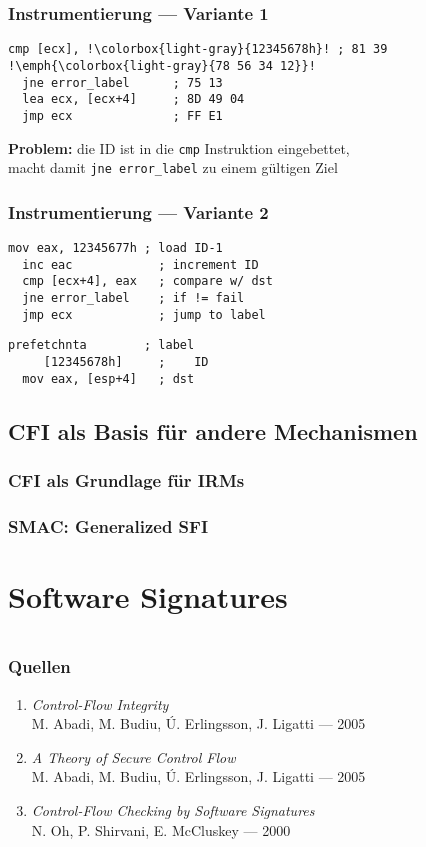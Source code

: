 \documentclass[serif,slidestop,compress,red]{beamer}
\begin{document}
\begin{frame}[fragile]
  \frametitle{Instrumentierung — Variante 1}
  \begin{lstlisting}[title=Quelle,escapechar=!]
  cmp [ecx], !\colorbox{light-gray}{12345678h}! ; 81 39 !\emph{\colorbox{light-gray}{78 56 34 12}}!
  jne error_label      ; 75 13
  lea ecx, [ecx+4]     ; 8D 49 04
  jmp ecx              ; FF E1
  \end{lstlisting}
  \textbf{Problem:} die ID ist in die \texttt{cmp} Instruktion eingebettet, \\ macht
  damit \texttt{jne error\_label} zu einem gültigen Ziel
\end{frame}

\begin{frame}[fragile]
  \frametitle{Instrumentierung — Variante 2}
  \begin{lstlisting}[title=Quelle]
  mov eax, 12345677h ; load ID-1
  inc eac            ; increment ID
  cmp [ecx+4], eax   ; compare w/ dst
  jne error_label    ; if != fail
  jmp ecx            ; jump to label
  \end{lstlisting}
  \begin{lstlisting}[title=Ziel]
  prefetchnta        ; label
     [12345678h]     ;    ID
  mov eax, [esp+4]   ; dst
  \end{lstlisting}
\end{frame}

\subsection{CFI als Basis für andere Mechanismen}

\begin{frame}
  \frametitle{CFI als Grundlage für IRMs}
\end{frame}

\begin{frame}
  \frametitle{SMAC: Generalized SFI}
\end{frame}

\section{Software Signatures}

\section{}

\begin{frame}
  \frametitle{Quellen}
  \begin{enumerate}
    \item \emph{Control-Flow Integrity} \\ M. Abadi, M. Budiu, Ú. Erlingsson, J. Ligatti — 2005
    \item \emph{A Theory of Secure Control Flow} \\ M. Abadi, M. Budiu, Ú. Erlingsson, J. Ligatti — 2005
    \item \emph{Control-Flow Checking by Software Signatures} \\ N. Oh, P. Shirvani, E. McCluskey — 2000
  \end{enumerate}
\end{frame}
\end{document}

